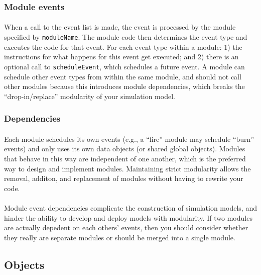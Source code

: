 \documentclass{article}
\begin{document}
\subsubsection{Module events}

\paragraph{}
When a call to the event list is made, the event is processed by the module specified by \texttt{moduleName}. The module code then determines the event type and executes the code for that event. For each event type within a module: 1) the instructions for what happens for this event get executed; and 2) there is an optional call to \texttt{scheduleEvent}, which schedules a future event. A module can schedule other event types from within the same module, and should not call other modules because this introduces module dependencies, which breaks the ``drop-in/replace'' modularity of your simulation model.

\subsubsection{Dependencies}

\paragraph{}
Each module schedules its own events (e.g., a ``fire'' module may schedule ``burn'' events) and only uses its own data objects (or shared global objects). Modules that behave in this way are independent of one another, which is the preferred way to design and implement modules. Maintaining strict modularity allows the removal, additon, and replacement of modules without having to rewrite your code.

\paragraph{}
Module event dependencies complicate the construction of simulation models, and hinder the ability to develop and deploy models with modularity. If two modules are actually depedent on each others' events, then you should consider whether they really are separate modules or should be merged into a single module.

\subsection{Objects}
\end{document}
